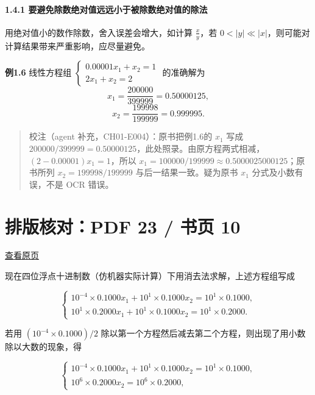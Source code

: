 \documentclass[
  10pt,
  a4paper,
]{article}
\begin{document}
\paragraph{1.4.1
要避免除数绝对值远远小于被除数绝对值的除法}\label{ux8981ux907fux514dux9664ux6570ux7eddux5bf9ux503cux8fdcux8fdcux5c0fux4e8eux88abux9664ux6570ux7eddux5bf9ux503cux7684ux9664ux6cd5}

用绝对值小的数作除数，舍入误差会增大，如计算 \(\frac{x}{y}\)，若
\(0 < |y| \ll |x|\)，则可能对计算结果带来严重影响，应尽量避免。

\textbf{例1.6} 线性方程组
\(\begin{cases} 0.00001x_1 + x_2 = 1 \\ 2x_1 + x_2 = 2 \end{cases}\)
的准确解为 \[
x_1 = \frac{200000}{399999} = 0.50000125,
\] \[
x_2 = \frac{199998}{199999} = 0.999995.
\]

\begin{quote}
校注（agent 补充，CH01-E004）：原书把例1.6的 \(x_1\) 写成
\(200000/399999=0.50000125\)，此处照录。由原方程两式相减，\((2-0.00001)x_1=1\)，所以
\(x_1=100000/199999\approx0.5000025000125\)；原书所列
\(x_2=199998/199999\) 与后一结果一致。疑为原书 \(x_1\)
分式及小数有误，不是 OCR 错误。
\end{quote}

\newpage

\section{排版核对：PDF 23 / 书页
10}\label{ux6392ux7248ux6838ux5bf9pdf-23-ux4e66ux9875-10}

\href{../../../source-images/pdf-023.jpeg}{查看原页}

现在四位浮点十进制数（仿机器实际计算）下用消去法求解，上述方程组写成

\[
\begin{cases} 10^{-4} \times 0.1000x_1 + 10^1 \times 0.1000x_2 = 10^1 \times 0.1000, \\ 10^1 \times 0.2000x_1 + 10^1 \times 0.1000x_2 = 10^1 \times 0.2000. \end{cases}
\]

若用 \((10^{-4} \times 0.1000)/2\)
除以第一个方程然后减去第二个方程，则出现了用小数除以大数的现象，得

\[
\begin{cases} 10^{-4} \times 0.1000x_1 + 10^1 \times 0.1000x_2 = 10^1 \times 0.1000, \\ 10^6 \times 0.2000x_2 = 10^6 \times 0.2000, \end{cases}
\]
\end{document}
